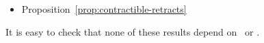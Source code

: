 \begin{rem}
{\begin{itemize}[label=$\diamond$]
\begin{itemize}[label=$\triangleright$]
\begin{itemize}
\begin{itemize}[label=$\circ$]
\begin{enumerate}[label=$\scriptstyle\bullet$]
                    \begin{enumerate}[label=$\scriptstyle\bullet$]
                        \item Lemma~\ref{lem:X->X-id-homotopy}
                    \end{enumerate}
                \end{enumerate}
                \item {}
            \end{itemize}
        \end{itemize}
        \item Proposition~\ref{prop:contractible-retracts}
    \end{itemize}
\end{itemize}
It is easy to check that none of these results depend on \WE\ or \FE.

}
\end{rem}
